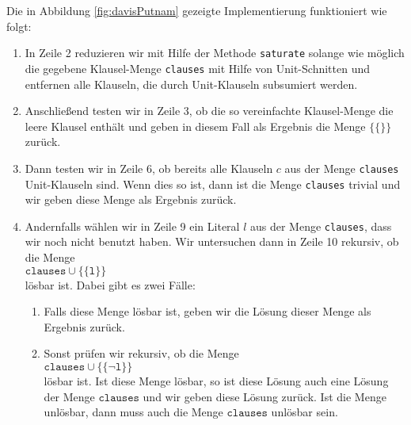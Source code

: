 Die in Abbildung \ref{fig:davisPutnam} gezeigte Implementierung funktioniert wie folgt:
\begin{enumerate}
\item In Zeile 2 reduzieren wir mit Hilfe der Methode \texttt{saturate} 
      solange wie m\"{o}glich die gegebene Klausel-Menge \texttt{clauses} mit Hilfe
      von Unit-Schnitten und entfernen alle Klauseln, die durch Unit-Klauseln
      subsumiert werden.
\item Anschlie\ss{}end testen wir in Zeile 3, ob die so vereinfachte Klausel-Menge
      die leere Klausel enth\"{a}lt und geben in diesem Fall als Ergebnis die Menge 
      $\bigl\{\{\}\bigr\}$ zur\"{u}ck.
\item Dann testen wir in Zeile 6, ob bereits alle Klauseln $c$ aus der Menge
      \texttt{clauses} Unit-Klauseln sind.  Wenn dies so ist,
      dann ist die Menge \texttt{clauses} trivial und wir geben diese Menge als Ergebnis zur\"{u}ck.
\item Andernfalls w\"{a}hlen wir in Zeile 9 ein Literal $l$ aus der Menge \texttt{clauses}, 
      dass wir noch nicht benutzt haben.
      Wir untersuchen dann in Zeile 10 rekursiv, ob die Menge \\[0.2cm]
      \hspace*{1.3cm} 
      $\texttt{clauses} \cup \bigl\{\{\texttt{l}\}\bigr\}$ 
      \\[0.2cm]
      l\"{o}sbar ist.  Dabei gibt es zwei F\"{a}lle:
      \begin{enumerate}
      \item Falls diese Menge l\"{o}sbar ist, geben wir die L\"{o}sung dieser Menge als Ergebnis zur\"{u}ck.

      \item Sonst  pr\"{u}fen wir rekursiv, ob die Menge 
            \\[0.2cm]
            \hspace*{1.3cm}
            $\texttt{clauses} \cup \bigl\{ \{ \neg \texttt{l}\} \bigr\}$ 
            \\[0.2cm]
            l\"{o}sbar ist.  Ist diese Menge l\"{o}sbar, so ist diese L\"{o}sung auch eine
            L\"{o}sung der Menge $\texttt{clauses}$ und wir geben diese L\"{o}sung zur\"{u}ck.  Ist die
            Menge unl\"{o}sbar, dann muss auch die Menge $\texttt{clauses}$ unl\"{o}sbar sein.
      \end{enumerate}
\end{enumerate}
